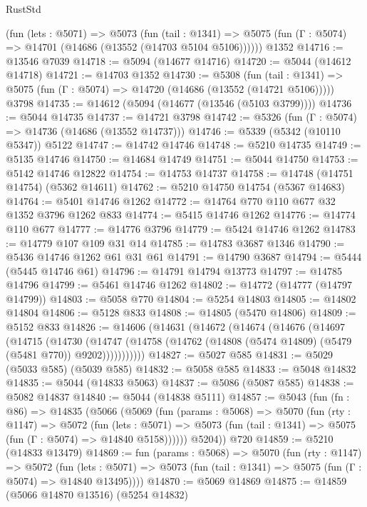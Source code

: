 \begin{lexlean}{RustStd}
\begin{coremodule}
    (fun (lets : @5071) =>
    @5073
      (fun (tail : @1341) =>
      @5075 (fun (Γ : @5074) => @14701 (@14686 (@13552 (@14703 @5104 @5106))))))
    @1352
@14716 := @13546 @7039
@14718 := @5094 (@14677 @14716)
@14720 := @5044 (@14612 @14718)
@14721 := @14703 @1352
@14730 := @5308
    (fun (tail : @1341) => @5075 (fun (Γ : @5074) => @14720 (@14686 (@13552 (@14721 @5106)))))
    @3798
@14735 := @14612 (@5094 (@14677 (@13546 (@5103 @3799))))
@14736 := @5044 @14735
@14737 := @14721 @3798
@14742 := @5326 (fun (Γ : @5074) => @14736 (@14686 (@13552 @14737)))
@14746 := @5339 (@5342 (@10110 @5347)) @5122
@14747 := @14742 @14746
@14748 := @5210 @14735
@14749 := @5135 @14746
@14750 := @14684 @14749
@14751 := @5044 @14750
@14753 := @5142 @14746 @12822
@14754 := @14753 @14737
@14758 := @14748 (@14751 @14754) (@5362 @14611)
@14762 := @5210 @14750 @14754 (@5367 @14683)
@14764 := @5401 @14746 @1262
@14772 := @14764 @770 @110 @677 @32 @1352 @3796 @1262 @833
@14774 := @5415 @14746 @1262
@14776 := @14774 @110 @677
@14777 := @14776 @3796
@14779 := @5424 @14746 @1262
@14783 := @14779 @107 @109 @31 @14
@14785 := @14783 @3687 @1346
@14790 := @5436 @14746 @1262 @61 @31 @61
@14791 := @14790 @3687
@14794 := @5444 (@5445 @14746 @61)
@14796 := @14791 @14794 @13773
@14797 := @14785 @14796
@14799 := @5461 @14746 @1262
@14802 := @14772 (@14777 (@14797 @14799))
@14803 := @5058 @770
@14804 := @5254 @14803
@14805 := @14802 @14804
@14806 := @5128 @833
@14808 := @14805 (@5470 @14806)
@14809 := @5152 @833
@14826 := @14606
    (@14631
      (@14672
        (@14674
          (@14676
            (@14697
              (@14715
                (@14730
                  (@14747
                    (@14758 (@14762 (@14808 (@5474 @14809) (@5479 (@5481 @770)) @9202)))))))))))
@14827 := @5027 @585
@14831 := @5029 (@5033 @585) (@5039 @585)
@14832 := @5058 @585
@14833 := @5048 @14832
@14835 := @5044 (@14833 @5063)
@14837 := @5086 (@5087 @585)
@14838 := @5082 @14837
@14840 := @5044 (@14838 @5111)
@14857 := @5043
    (fun (fn : @86) =>
    @14835
      (@5066
        (@5069
          (fun (params : @5068) =>
          @5070
            (fun (rty : @1147) =>
            @5072
              (fun (lets : @5071) =>
              @5073 (fun (tail : @1341) => @5075 (fun (Γ : @5074) => @14840 @5158))))))
        @5204))
    @720
@14859 := @5210 (@14833 @13479)
@14869 := fun (params : @5068) =>
  @5070
    (fun (rty : @1147) =>
    @5072
      (fun (lets : @5071) =>
      @5073 (fun (tail : @1341) => @5075 (fun (Γ : @5074) => @14840 @13495))))
@14870 := @5069 @14869
@14875 := @14859 (@5066 @14870 @13516) (@5254 @14832)

\end{coremodule}
\end{lexlean}
